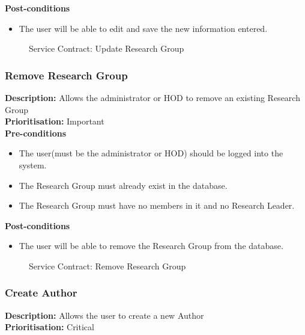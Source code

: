 \documentclass[a4paper]{article}
\begin{document}
	\textbf{Post-conditions}
	\begin{itemize}
		\item The user will be able to edit and save the new information entered.
	\end{itemize}
	
	\begin{figure}[H]
		\centering
		\caption{Service Contract: Update Research Group}
	\end{figure}
	
	\pagebreak
	\subsubsection{Remove Research Group}
	\textbf{Description:} Allows the administrator or HOD to remove an existing Research Group\\
	\textbf{Prioritisation:} Important\\
	
	\textbf{Pre-conditions}
	\begin{itemize}
		\item The user(must be the administrator or HOD) should be logged into the system.
		\item The Research Group must already exist in the database.
		\item The Research Group must have no members in it and no Research Leader.
	\end{itemize}
	
	\textbf{Post-conditions}
	\begin{itemize}
		\item The user will be able to remove the Research Group from the database.
	\end{itemize}
	
	\begin{figure}[H]
		\centering
		\caption{Service Contract: Remove Research Group}
	\end{figure}
	
	\pagebreak
	\subsubsection{Create Author}
	\textbf{Description:} Allows the user to create a new Author\\
	\textbf{Prioritisation:} Critical\\
	
\end{document}
